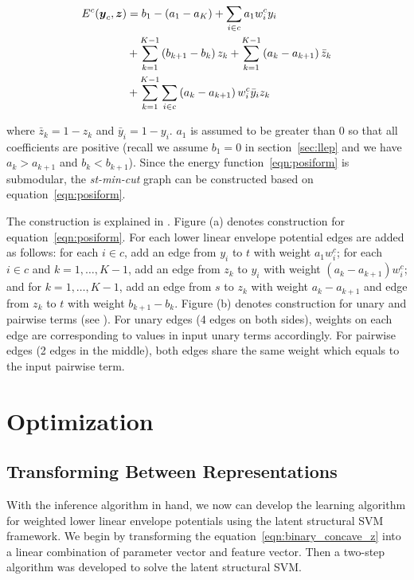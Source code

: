 \documentclass[sigconf, anonymous, review]{acmart}
\renewcommand{\cite}{\citep}
\begin{document}
\begin{align}
  \label{eqn:posiform}  
  E^c({\boldsymbol{y}}_c, {\boldsymbol{z}})
  &= b_1 - (a_1 - a_K) + \sum_{i \in c} a_1 w^c_i y_i \notag\\
  & + \sum_{k = 1}^{K - 1} \left( b_{k+1} - b_k \right) z_k
    + \sum_{k = 1}^{K - 1} \left( a_k - a_{k+1} \right)
    \bar{z}_k\notag\\
  & + \sum_{k = 1}^{K - 1} \sum_{i \in c} \left( a_k - a_{k+1}
    \right) w^c_i \bar{y}_i z_k
\end{align}

\noindent where $\bar{z}_k = 1 - z_k$ and $\bar{y}_i = 1 - y_i$.
$a_1$ is assumed to be greater than $0$ so that all coefficients
are positive (recall we assume $b_1=0$ in section~\ref{sec:llep}
and we have $a_k > a_{k+1}$ and $b_k < b_{k+1}$). Since the energy function~\eqref{eqn:posiform}
is submodular, the \emph{st-min-cut} graph can be constructed 
based on equation~\eqref{eqn:posiform}.

The construction is explained in . Figure
(a) denotes construction for equation~\eqref{eqn:posiform}. For
each lower linear envelope potential edges are added as follows:
for each $i \in c$, add an edge from $y_i$ to $t$ with weight
$a_1 w^c_i$; for each $i \in c$ and $k = 1, \ldots, K-1$, add an
edge from $z_k$ to $y_i$ with weight $(a_{k} - a_{k+1}) w^c_i$;
and for $k = 1, \ldots, K-1$, add an edge from $s$ to $z_k$ with
weight $a_k - a_{k+1}$ and edge from $z_k$ to $t$ with weight
$b_{k+1} - b_k$. Figure (b) denotes construction for unary and
pairwise terms (see \cite{Kolmogorov:PAMI04}). For unary edges (4
edges on both sides), weights on each edge are corresponding to
values in input unary terms accordingly. For pairwise edges (2
edges in the middle), both edges share the same weight which
equals to the input pairwise term.

\section{Optimization}
\label{sec:opt}


\subsection{Transforming Between Representations}
\label{sec:learning}
With the inference algorithm in hand, we now can develop the
learning algorithm for weighted lower linear envelope potentials
using the latent structural SVM framework. We begin by
transforming the equation~\eqref{eqn:binary_concave_z} into a
linear combination of parameter vector and feature vector. Then a
two-step algorithm was developed to solve the latent structural
SVM.
\end{document}
